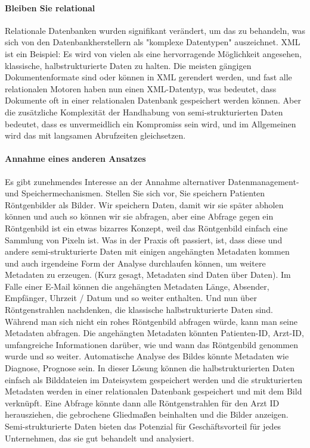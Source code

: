\paragraph{Bleiben Sie relational} Relationale Datenbanken wurden signifikant verändert, um das zu behandeln, was sich von den Datenbankherstellern als "komplexe Datentypen" auszeichnet. XML ist ein Beispiel: Es wird von vielen als eine hervorragende Möglichkeit angesehen, klassische, halbstrukturierte Daten zu halten. Die meisten gängigen Dokumentenformate sind oder können in XML gerendert werden, und fast alle relationalen Motoren haben nun einen XML-Datentyp, was bedeutet, dass Dokumente oft in einer relationalen Datenbank gespeichert werden können. Aber die zusätzliche Komplexität der Handhabung von semi-strukturierten Daten bedeutet, dass es unvermeidlich ein Kompromiss sein wird, und im Allgemeinen wird das mit langsamen Abrufzeiten gleichsetzen. 
\paragraph{Annahme eines anderen Ansatzes} Es gibt zunehmendes Interesse an der Annahme alternativer Datenmanagement- und Speichermechanismen. Stellen Sie sich vor, Sie speichern Patienten Röntgenbilder als Bilder. Wir speichern Daten, damit wir sie später abholen können und auch so können wir sie abfragen, aber eine Abfrage gegen ein Röntgenbild ist ein etwas bizarres Konzept, weil das Röntgenbild einfach eine Sammlung von Pixeln ist. Was in der Praxis oft passiert, ist, dass diese und andere semi-strukturierte Daten mit einigen angehängten Metadaten kommen und auch irgendeine Form der Analyse durchlaufen können, um weitere Metadaten zu erzeugen. (Kurz gesagt, Metadaten sind Daten über Daten). Im Falle einer E-Mail können die angehängten Metadaten Länge, Absender, Empfänger, Uhrzeit / Datum und so weiter enthalten. \cite{bry2001}
Und nun über Röntgenstrahlen nachdenken, die klassische halbstrukturierte Daten sind. Während man sich nicht ein rohes Röntgenbild abfragen würde, kann man seine Metadaten abfragen. Die angehängten Metadaten könnten Patienten-ID, Arzt-ID, umfangreiche Informationen darüber, wie und wann das Röntgenbild genommen wurde und so weiter. Automatische Analyse des Bildes könnte Metadaten wie Diagnose, Prognose sein. In dieser Lösung können die halbstrukturierten Daten einfach als Bilddateien im Dateisystem gespeichert werden und die strukturierten Metadaten werden in einer relationalen Datenbank gespeichert und mit dem Bild verknüpft. Eine Abfrage könnte dann alle Röntgenstrahlen für den Arzt ID herausziehen, die gebrochene Gliedmaßen beinhalten und die Bilder anzeigen. \cite{abiteboul2000}
Semi-strukturierte Daten bieten das Potenzial für Geschäftsvorteil für jedes Unternehmen, das sie gut behandelt und analysiert.

